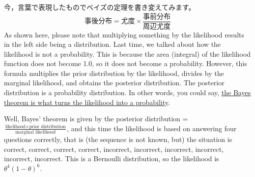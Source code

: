 \documentclass{ltjsbook}
\begin{document}
今，言葉で表現したものでベイズの定理を書き変えてみます。
\[ \mbox{事後分布} = \mbox{尤度} \times \frac{事前分布}{周辺尤度}\]
As shown here, please note that multiplying something by the likelihood results in the left side being a distribution. Last time, we talked about how the likelihood is not a probability. This is because the area (integral) of the likelihood function does not become 1.0, so it does not become a probability. However, this formula multiplies the prior distribution by the likelihood, divides by the marginal likelihood, and obtains the posterior distribution. The posterior distribution is a probability distribution. In other words, you could say, \underline{the Bayes theorem is what turns the likelihood into a probability}.

Well, Bayes' theorem is given by the posterior distribution = $ \frac{\mbox{likelihood}\times \mbox{prior distribution}}{\mbox{marginal likelihood}}$, and this time the likelihood is based on answering four questions correctly, that is (the sequence is not known, but) the situation is correct, correct, correct, correct, incorrect, incorrect, incorrect, incorrect, incorrect, incorrect. This is a Bernoulli distribution, so the likelihood is $\theta^4(1-\theta)^6$.


\end{document}
